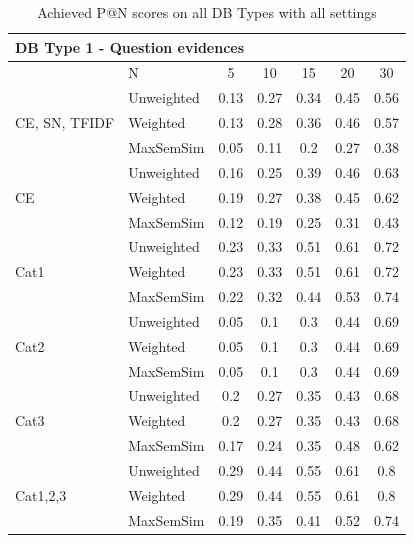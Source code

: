 \documentclass[conference]{IEEEtran}
\begin{document}
\begin{table}[!h]
	\centering
	\renewcommand{\arraystretch}{1.3}
	\caption{Achieved P@N scores on all DB Types with all settings}
	\label{tab:resultsmrr}
	\begin{tabular}{l||l|ccccc}\hline
	
		\multicolumn{7}{l}{DB Type 1 - Question evidences}\\\hline\hline
		& N & 5 & 10 & 15 & 20 & 30\\\hline
		
		\multirow{3}{*}{CE, SN, TFIDF} & Unweighted & 0.13 & 0.27 & 0.34 & 0.45 & 0.56\\
		 & Weighted & 0.13 & 0.28 & 0.36 & 0.46 & 0.57\\
		 & MaxSemSim & 0.05 & 0.11 & 0.2 & 0.27 & 0.38\\
		 
		\multirow{3}{*}{CE} & Unweighted & 0.16 & 0.25 & 0.39 & 0.46 & 0.63\\
		 & Weighted & 0.19 & 0.27 & 0.38 & 0.45 & 0.62\\
		 & MaxSemSim & 0.12 & 0.19 & 0.25 & 0.31 & 0.43\\ 
		\hline
		
		\multirow{3}{*}{Cat1} & Unweighted & 0.23 & 0.33 & 0.51 & 0.61 & 0.72\\
		 & Weighted & 0.23 & 0.33 & 0.51 & 0.61 & 0.72\\
		 & MaxSemSim & 0.22 & 0.32 & 0.44 & 0.53 & 0.74\\ 
		\hline
		
		\multirow{3}{*}{Cat2} & Unweighted & 0.05 & 0.1 & 0.3 & 0.44 & 0.69\\
		 & Weighted & 0.05 & 0.1 & 0.3 & 0.44 & 0.69\\
		 & MaxSemSim & 0.05 & 0.1 & 0.3 & 0.44 & 0.69\\ 
		\hline
		
		\multirow{3}{*}{Cat3} & Unweighted & 0.2 & 0.27 & 0.35 & 0.43 & 0.68\\
		 & Weighted & 0.2 & 0.27 & 0.35 & 0.43 & 0.68\\
		 & MaxSemSim & 0.17 & 0.24 & 0.35 & 0.48 & 0.62\\ 
		\hline
		
		\multirow{3}{*}{Cat1,2,3} & Unweighted & 0.29 & 0.44 & 0.55 & 0.61 & 0.8\\
		 & Weighted & 0.29 & 0.44 & 0.55 & 0.61 & 0.8\\
		 & MaxSemSim & 0.19 & 0.35 & 0.41 & 0.52 & 0.74\\ 
		\hline
		

\end{tabular}
\end{table}
\end{document}
